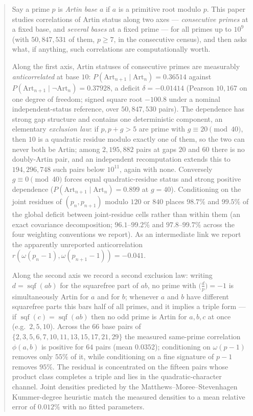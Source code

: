 \documentclass[11pt,reqno]{amsart}
\theoremstyle{plain}
\theoremstyle{definition}
\DeclareMathOperator{\sqf}{sqf}
\newcommand{\Art}{\mathrm{Art}}
\begin{document}
\begin{abstract}
	Say a prime $p$ is \emph{Artin base $a$} if $a$ is a primitive root modulo $p$.
	This paper studies correlations of Artin status along two axes --- \emph{consecutive
	primes} at a fixed base, and \emph{several bases} at a fixed prime --- for all primes up to $10^9$ (with $50{,}847{,}531$ of them, $p\ge 7$, in the
	consecutive census), and then asks what, if anything, such correlations are
	computationally worth.

	Along the first axis, Artin statuses of consecutive primes are measurably
	\emph{anticorrelated} at base $10$: $P(\Art_{n+1}\mid\Art_n)=0.36514$ against
	$P(\Art_{n+1}\mid\lnot\Art_n)=0.37928$, a deficit $\delta=-0.01414$
	(Pearson $10{,}167$ on one degree of freedom; signed square root $-100.8$ under a
	nominal independent-status reference, over $50{,}847{,}530$ pairs). The dependence
	has strong gap structure and contains one deterministic component, an elementary
	\emph{exclusion law}: if $p,p+g>5$ are prime with $g\equiv 20 \pmod{40}$, then $10$
	is a quadratic residue modulo exactly one of them, so the two can never both be
	Artin; among $2{,}195{,}882$ pairs at gaps $20$ and $60$ there is no doubly-Artin
	pair, and an independent recomputation extends this to $194{,}296{,}748$ such pairs
	below $10^{11}$, again with none. Conversely $g \equiv 0 \pmod{40}$ forces equal
	quadratic-residue status and strong positive dependence ($P(\Art_{n+1}\mid\Art_n)=0.899$
	at $g=40$). Conditioning on the joint residues of $(p_n,p_{n+1})$ modulo $120$ or
	$840$ places $98.7\%$ and $99.5\%$ of the global deficit between joint-residue cells
	rather than within them (an exact covariance decomposition; $96.1$--$99.2\%$ and $97.8$--$99.7\%$
	across the four weighting conventions we report). As an intermediate link we report the apparently unreported
	anticorrelation $r(\omega(p_n-1),\omega(p_{n+1}-1))=-0.041$.

	Along the second axis we record a second exclusion law: writing $d=\sqf(ab)$ for the
	squarefree part of $ab$, no prime with $\bigl(\tfrac{d}{p}\bigr)=-1$ is simultaneously
	Artin for $a$ and for $b$; whenever $a$ and $b$ have different squarefree parts this
	bars half of all primes, and it implies a triple form --- if $\sqf(c)=\sqf(ab)$ then no
	odd prime is Artin for $a,b,c$ at once (e.g.\ $2,5,10$). Across the $66$ base pairs of
	$\{2,3,5,6,7,10,11,13,15,17,21,29\}$ the measured same-prime correlation $\phi(a,b)$ is
	positive for $64$ pairs (mean $0.0352$); conditioning on $\omega(p-1)$ removes only
	$55\%$ of it, while conditioning on a fine signature of $p-1$ removes $95\%$. The
	residual is concentrated on the fifteen pairs whose product class completes a triple
	and lies in the quadratic-character channel. Joint densities predicted by the
	Matthews--Moree--Stevenhagen Kummer-degree heuristic match the measured densities to a
	mean relative error of $0.012\%$ with no fitted parameters.


\end{abstract}
\end{document}

